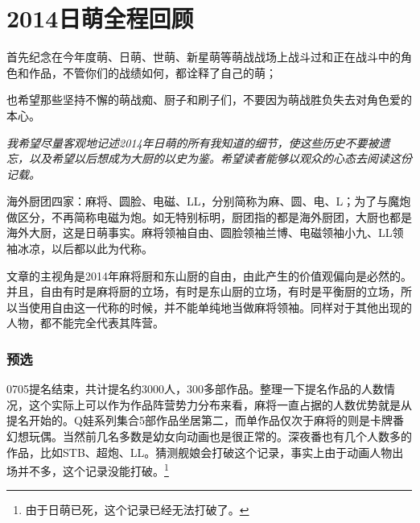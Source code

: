 
\part{2014日萌全程回顾}
\setcounter{section}{0}

首先纪念在今年度萌、日萌、世萌、新星萌等萌战战场上战斗过和正在战斗中的角色和作品，不管你们的战绩如何，都诠释了自己的萌；

也希望那些坚持不懈的萌战痴、厨子和刷子们，不要因为萌战胜负失去对角色爱的本心。

\emph{我希望尽量客观地记述2014年日萌的所有我知道的细节，使这些历史不要被遗忘，以及希望以后想成为大厨的以史为鉴。希望读者能够以观众的心态去阅读这份记载。}

海外厨团四家：麻将、圆脸、电磁、LL，分别简称为麻、圆、电、L；为了与魔炮做区分，不再简称电磁为炮。如无特别标明，厨团指的都是海外厨团，大厨也都是海外大厨，这是日萌事实。麻将领袖自由、圆脸领袖兰博、电磁领袖小九、LL领袖冰凉，以后都以此为代称。

文章的主视角是2014年麻将厨和东山厨的自由，由此产生的价值观偏向是必然的。并且，自由有时是麻将厨的立场，有时是东山厨的立场，有时是平衡厨的立场，所以当使用自由这一代称的时候，并不能单纯地当做麻将领袖。同样对于其他出现的人物，都不能完全代表其阵营。

\section{预选}

0705提名结束，共计提名约3000人，300多部作品。整理一下提名作品的人数情况，这个实际上可以作为作品阵营势力分布来看，麻将一直占据的人数优势就是从提名开始的。Q娃系列集合5部作品坐居第二，而单作品仅次于麻将的则是卡牌番幻想玩偶。当然前几名多数是幼女向动画也是很正常的。深夜番也有几个人数多的作品，比如STB、超炮、LL。猜测舰娘会打破这个记录，事实上由于动画人物出场并不多，这个记录没能打破。\footnote{由于日萌已死，这个记录已经无法打破了。}

